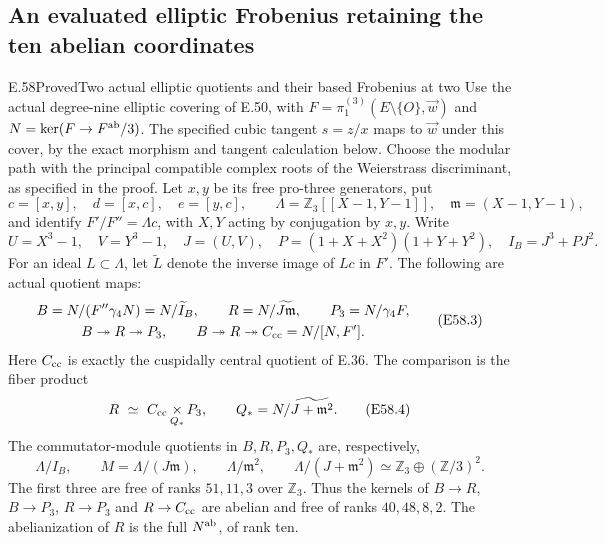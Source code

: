 \subsection{An evaluated elliptic Frobenius retaining the ten abelian coordinates}

\begin{statement}{E.58}{Proved}{Two actual elliptic quotients and their based Frobenius at two}
Use the actual degree-nine elliptic covering of E.50, with
$F=\pi_1^{(3)}(E\setminus\{O\},\vec w)$ and
$N=\ker(F\to F^{\rm ab}/3)$.
The specified cubic tangent $s=z/x$ maps to $\vec w$ under this
cover, by the exact morphism and tangent calculation below.
Choose the modular path with the principal compatible complex roots
of the Weierstrass discriminant, as specified in the proof.
Let $x,y$ be its free pro-three generators, put
\[
 c=[x,y],\quad d=[x,c],\quad e=[y,c],\qquad
 \Lambda=\mathbb Z_3[[X-1,Y-1]],\quad
 \mathfrak m=(X-1,Y-1),
 \tag{E58.1}
\]
and identify $F'/F''=\Lambda c$, with $X,Y$ acting by
conjugation by $x,y$. Write
\[
 U=X^3-1,\quad V=Y^3-1,\quad J=(U,V),\quad
 P=(1+X+X^2)(1+Y+Y^2),\quad I_B=J^3+PJ^2.
 \tag{E58.2}
\]
For an ideal $L\subset\Lambda$, let $\widetilde L$ denote the
inverse image of $Lc$ in $F'$. The following are actual quotient maps:
\[
 \begin{gathered}
 B=N/(F''\gamma_4N)=N/\widetilde I_B,
 \qquad R=N/\widetilde{J\mathfrak m},
 \qquad P_3=N/\gamma_4F,\\
 B\twoheadrightarrow R\twoheadrightarrow P_3,
 \qquad B\twoheadrightarrow R\twoheadrightarrow
 C_{\rm cc}=N/[N,F'].
 \end{gathered}
 \tag{E58.3}
\]
Here $C_{\rm cc}$ is exactly the cuspidally central quotient of E.36.
The comparison is the fiber product
\[
 R\ \simeq\ C_{\rm cc}\mathop{\times}_{Q_*}P_3,
 \qquad Q_*=N/\widetilde{J+\mathfrak m^2}.
 \tag{E58.4}
\]
The commutator-module quotients in $B,R,P_3,Q_*$ are, respectively,
\[
 \Lambda/I_B,\qquad
 M=\Lambda/(J\mathfrak m),\qquad
 \Lambda/\mathfrak m^2,\qquad
 \Lambda/(J+\mathfrak m^2)
       \simeq\mathbb Z_3\oplus(\mathbb Z/3)^2.
 \tag{E58.5}
\]
The first three are free of ranks $51,11,3$ over $\mathbb Z_3$.
Thus the kernels of $B\to R$, $B\to P_3$, $R\to P_3$ and
$R\to C_{\rm cc}$ are abelian and free of ranks $40,48,8,2$.
The abelianization of $R$ is the full $N^{\rm ab}$, of rank ten.


\end{statement}
